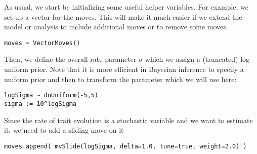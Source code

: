 
As usual, we start be initializing some useful helper variables.
For example, we set up a vector for the moves.
This will make it much easier if we extend the model or analysis to include additional moves or to remove some moves.
{\tt \begin{snugshade*}
\begin{lstlisting}
moves = VectorMoves() 
\end{lstlisting}
\end{snugshade*}}

Then, we define the overall rate parameter $\sigma$ which we assign a (truncated) log-uniform prior. Note that it is more efficient in Bayesian inference to specify a uniform prior and then to transform the parameter which we will use here:
{\tt \small \begin{snugshade*}
\begin{lstlisting}
logSigma ~ dnUniform(-5,5)
sigma := 10^logSigma
\end{lstlisting}
\end{snugshade*}}

Since the rate of trait evolution  is a stochastic variable and we want to estimate it, we need to add a sliding move on it
{\tt \small \begin{snugshade*}
\begin{lstlisting}
moves.append( mvSlide(logSigma, delta=1.0, tune=true, weight=2.0) )
\end{lstlisting}
\end{snugshade*}}

